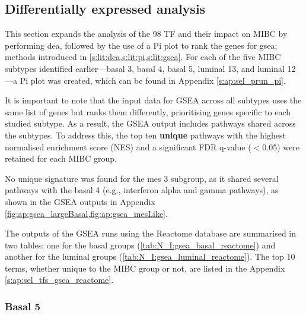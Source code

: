 \subsection{Differentially expressed analysis} \label{s:N_I:sel_tfs_subtypes}

This section expands the analysis of the 98 TF and their impact on MIBC by performing \acrlong{dea}, followed by the use of a Pi plot to rank the genes for \acrfull{gsea}; methods introduced in \cref{s:lit:dea,s:lit:pi,s:lit:gsea}. For each of the five MIBC subtypes identified earlier—basal 3, basal 4, basal 5, luminal 13, and luminal 12—a Pi plot was created, which can be found in Appendix \cref{s:ap:sel_prun_pi}. 

It is important to note that the input data for GSEA across all subtypes uses the same list of genes but ranks them differently, prioritising genes specific to each studied subtype. As a result, the GSEA output includes pathways shared across the subtypes. To address this, the top ten \textbf{unique} pathways with the highest normalised enrichment score (NES) and a significant FDR q-value ($<$0.05) were retained for each MIBC group.

No unique signature was found for the mes 3 subgroup, as it shared several pathways with the basal 4 (e.g., interferon alpha and gamma pathways), as shown in the GSEA outputs in Appendix \cref{fig:ap:gsea_largeBasal,fig:ap:gsea_mesLike}.

The outputs of the GSEA runs using the Reactome database are summarised in two tables: one for the basal groups (\cref{tab:N_I:gsea_basal_reactome}) and another for the luminal groups (\cref{tab:N_I:gsea_luminal_reactome}). The top 10 terms, whether unique to the MIBC group or not, are listed in the Appendix \cref{s:ap:sel_tfs_gsea_reactome}.


\subsubsection*{Basal 5}


